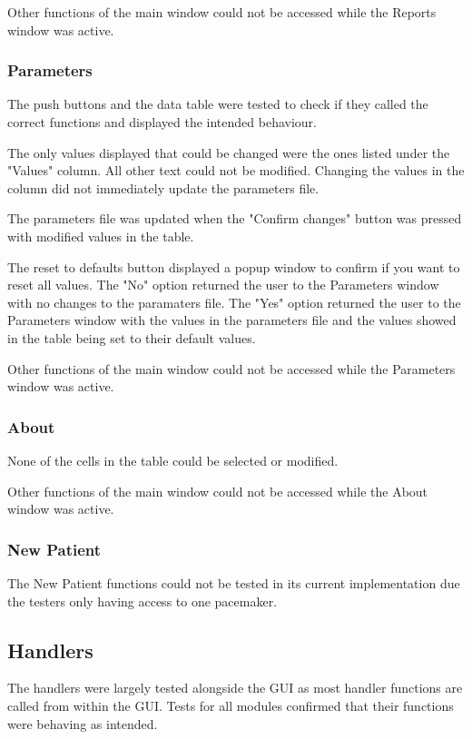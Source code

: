 \documentclass[12pt]{article}
\begin{document}
Other functions of the main window could not be accessed while the Reports window was active.

\subsubsection{Parameters}\label{Testing:Parameters}
The push buttons and the data table were tested to check if they called the correct functions and displayed the intended behaviour.

The only values displayed that could be changed were the ones listed under the "Values" column. All other text could not be modified. Changing the values in the column did not immediately update the parameters file.

The parameters file was updated when the "Confirm changes" button was pressed with modified values in the table.

The reset to defaults button displayed a popup window to confirm if you want to reset all values. The "No" option returned the user to the Parameters window with no changes to the paramaters file. The "Yes" option returned the user to the Parameters window with the values in the parameters file and the values showed in the table being set to their default values.

Other functions of the main window could not be accessed while the Parameters window was active.

\subsubsection{About}
None of the cells in the table could be selected or modified.

Other functions of the main window could not be accessed while the About window was active.

\subsubsection{New Patient}
The New Patient functions could not be tested in its current implementation due the testers only having access to one pacemaker.

\subsection{Handlers}
The handlers were largely tested alongside the GUI as most handler functions are called from within the GUI. Tests for all modules confirmed that their functions were behaving as intended.
\end{document}
